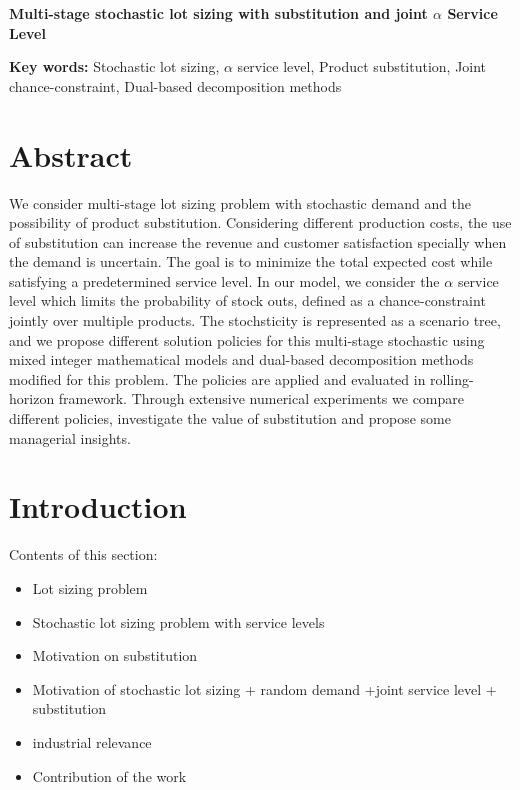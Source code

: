 \documentclass[10pt]{article}
\def\Title#1{\begin{center} {\Large {\bf #1} } \end{center}}
\begin{document}
\Title{Multi-stage stochastic lot sizing with substitution and joint $\alpha$ Service Level }

\bigskip\bigskip









 \textbf{\large Key words:} Stochastic lot sizing, $\alpha$ service level, Product substitution, Joint chance-constraint, Dual-based decomposition methods



\section{Abstract}

We consider multi-stage lot sizing problem with stochastic demand and the possibility of product substitution. Considering different production costs, the use of substitution can increase the revenue and customer satisfaction specially when the demand is uncertain. The goal is to minimize the total expected cost while satisfying a predetermined service level. In our model, we consider the $\alpha$ service level which limits the probability of stock outs, defined as a chance-constraint jointly over multiple products. The stochsticity is represented as a scenario tree, and we propose different solution policies for this multi-stage stochastic using mixed integer mathematical models and dual-based decomposition methods modified for this problem. The policies are applied and evaluated in rolling-horizon framework. Through extensive numerical experiments we compare different policies, investigate the value of substitution and propose some managerial insights. 

\section{Introduction}
Contents of this section:
\begin{itemize}
    \item Lot sizing problem 
    \item Stochastic lot sizing problem with service levels
    \item Motivation on substitution
    \item Motivation of stochastic lot sizing + random demand +joint service level + substitution 
    \item industrial relevance
    \item Contribution of the work
\end{itemize}
\end{document}
